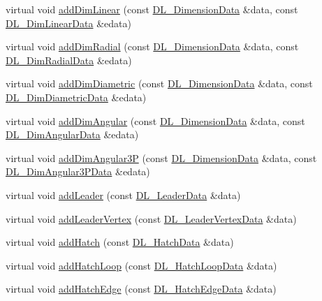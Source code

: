 \begin{DoxyCompactItemize}
\item 
virtual void \hyperlink{classRS__FilterJWW_a9956e75921b0fc913f57bf4409bb621f}{add\-Dim\-Linear} (const \hyperlink{structDL__DimensionData}{D\-L\-\_\-\-Dimension\-Data} \&data, const \hyperlink{structDL__DimLinearData}{D\-L\-\_\-\-Dim\-Linear\-Data} \&edata)
\item 
virtual void \hyperlink{classRS__FilterJWW_afba9e69150315d5016869cd5ff70dd30}{add\-Dim\-Radial} (const \hyperlink{structDL__DimensionData}{D\-L\-\_\-\-Dimension\-Data} \&data, const \hyperlink{structDL__DimRadialData}{D\-L\-\_\-\-Dim\-Radial\-Data} \&edata)
\item 
virtual void \hyperlink{classRS__FilterJWW_a2a5d993c46e97dd763310f5d3be2c10d}{add\-Dim\-Diametric} (const \hyperlink{structDL__DimensionData}{D\-L\-\_\-\-Dimension\-Data} \&data, const \hyperlink{structDL__DimDiametricData}{D\-L\-\_\-\-Dim\-Diametric\-Data} \&edata)
\item 
virtual void \hyperlink{classRS__FilterJWW_a091d89a46af7dab4d4ad3f892d0f43d8}{add\-Dim\-Angular} (const \hyperlink{structDL__DimensionData}{D\-L\-\_\-\-Dimension\-Data} \&data, const \hyperlink{structDL__DimAngularData}{D\-L\-\_\-\-Dim\-Angular\-Data} \&edata)
\item 
virtual void \hyperlink{classRS__FilterJWW_a5d365a5d591de7b543c129b123e15675}{add\-Dim\-Angular3\-P} (const \hyperlink{structDL__DimensionData}{D\-L\-\_\-\-Dimension\-Data} \&data, const \hyperlink{structDL__DimAngular3PData}{D\-L\-\_\-\-Dim\-Angular3\-P\-Data} \&edata)
\item 
virtual void \hyperlink{classRS__FilterJWW_a38ee9c9fdd6f22ce1eec08a84c1112cd}{add\-Leader} (const \hyperlink{structDL__LeaderData}{D\-L\-\_\-\-Leader\-Data} \&data)
\item 
virtual void \hyperlink{classRS__FilterJWW_a4a193ffb37217f0a2d0b7546deac31ea}{add\-Leader\-Vertex} (const \hyperlink{structDL__LeaderVertexData}{D\-L\-\_\-\-Leader\-Vertex\-Data} \&data)
\item 
virtual void \hyperlink{classRS__FilterJWW_a4d64a25f6c6eb57335ecdbb2688acb2c}{add\-Hatch} (const \hyperlink{structDL__HatchData}{D\-L\-\_\-\-Hatch\-Data} \&data)
\item 
virtual void \hyperlink{classRS__FilterJWW_a2f263e4b35ac4d512d5ba91e49dd4585}{add\-Hatch\-Loop} (const \hyperlink{structDL__HatchLoopData}{D\-L\-\_\-\-Hatch\-Loop\-Data} \&data)
\item 
virtual void \hyperlink{classRS__FilterJWW_a466e2a49ecd4e34d3ed0bddb5d4f81a2}{add\-Hatch\-Edge} (const \hyperlink{structDL__HatchEdgeData}{D\-L\-\_\-\-Hatch\-Edge\-Data} \&data)

\end{DoxyCompactItemize}

